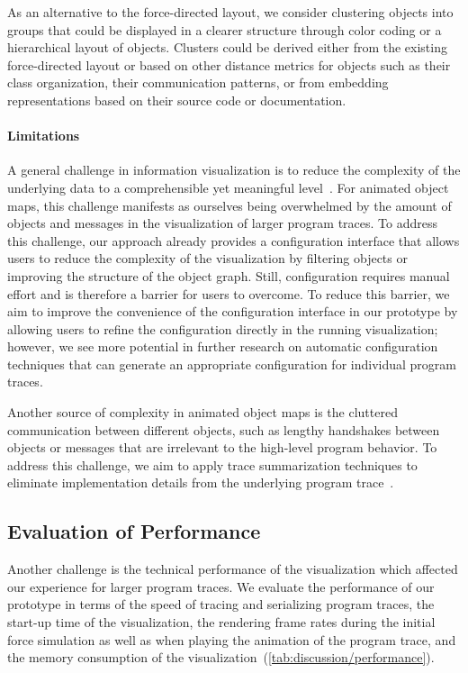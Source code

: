 As an alternative to the force-directed layout, we consider clustering objects into groups that could be displayed in a clearer structure through color coding or a hierarchical layout of objects.
Clusters could be derived either from the existing force-directed layout or based on other distance metrics for objects such as their class organization, their communication patterns, or from embedding representations based on their source code or documentation.

\paragraph{Limitations}

A general challenge in information visualization is to reduce the complexity of the underlying data to a comprehensible yet meaningful level~\cite{robertson2009scale}.
For animated object maps, this challenge manifests as ourselves being overwhelmed by the amount of objects and messages in the visualization of larger program traces.
To address this challenge, our approach already provides a configuration interface that allows users to reduce the complexity of the visualization by filtering objects or improving the structure of the object graph.
Still, configuration requires manual effort and is therefore a barrier for users to overcome.
To reduce this barrier, we aim to improve the convenience of the configuration interface in our prototype by allowing users to refine the configuration directly in the running visualization; however, we see more potential in further research on automatic configuration techniques that can generate an appropriate configuration for individual program traces.

Another source of complexity in animated object maps is the cluttered communication between different objects, such as lengthy handshakes between objects or messages that are irrelevant to the high-level program behavior.
To address this challenge, we aim to apply trace summarization techniques to eliminate implementation details from the underlying program trace~\cite{hamouLhadj2006summarizing,noda2017identifying}.

\subsection{Evaluation of Performance}

Another challenge is the technical performance of the visualization which affected our experience for larger program traces.
We evaluate the performance of our prototype in terms of the speed of tracing and serializing program traces, the start-up time of the visualization, the rendering frame rates during the initial force simulation as well as when playing the animation of the program trace, and the memory consumption of the visualization~(\cref{tab:discussion/performance}).


